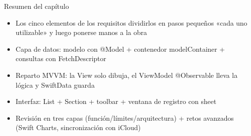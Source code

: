 \begin{tcbsummary}{Resumen del capítulo}
\begin{itemize}
  \item Los cinco elementos de los requisitos dividirlos en pasos pequeños «cada uno utilizable» y luego ponerse manos a la obra
  \item Capa de datos: modelo con @Model + contenedor modelContainer + consultas con FetchDescriptor
  \item Reparto MVVM: la View solo dibuja, el ViewModel @Observable lleva la lógica y SwiftData guarda
  \item Interfaz: List + Section + toolbar + ventana de registro con sheet
  \item Revisión en tres capas (función/límites/arquitectura) + retos avanzados (Swift Charts, sincronización con iCloud)
\end{itemize}

\end{tcbsummary}
